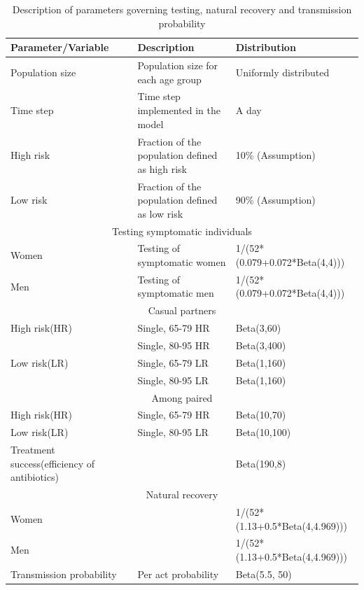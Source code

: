 \documentclass{article}
\begin{document}
\begin{normalsize}
	
	\begin{table}[H]
	\centering
    	\begin{tabular}{ |p{5cm}|p{7cm}|p{5cm}| } 
    		\hline
    		Parameter/Variable & Description & Distribution  \\ 
    		\hline
    		Population size & Population size for each age group & Uniformly distributed\\
    		Time step &	Time step implemented in the model & 	A day \\
			High risk & Fraction of the population defined as high risk	& 10\% (Assumption) \\
			Low risk & Fraction of the population defined as low risk & 90\% (Assumption)\\
			\hline
			\multicolumn{3}{|c|}{Testing symptomatic individuals} \\
			\hline
			Women &	Testing of symptomatic  women	& 1/(52*(0.079+0.072*Beta(4,4)))\\
			Men	& Testing of symptomatic men	& 1/(52*(0.079+0.072*Beta(4,4)))\\
			\hline
			\multicolumn{3}{|c|}{Casual partners} \\
			\hline
			High risk(HR)& Single, 65-79 HR	& Beta(3,60)\\
 						 & Single, 80-95 HR	& Beta(3,400)\\
			Low risk(LR)	 & Single, 65-79 LR	& Beta(1,160) \\
 						 & Single, 80-95 LR	&Beta(1,160)\\
 			\hline
 			\multicolumn{3}{|c|}{Among paired} \\
 			\hline
			High risk(HR)& Single, 65-79 HR	& Beta(10,70)\\
			Low risk(LR) & Single, 80-95 LR	& Beta(10,100)\\
			Treatment success(efficiency of antibiotics)	 & & Beta(190,8)\\
			\hline
			\multicolumn{3}{|c|}{Natural recovery} \\
			\hline
			Women & & 1/(52*(1.13+0.5*Beta(4,4.969)))\\
			Men & & 1/(52*(1.13+0.5*Beta(4,4.969)))\\
			Transmission probability	 & Per act probability	& Beta(5.5, 50)\\
    		\hline
    	\end{tabular}
    	
    	\caption{Description of parameters governing testing, natural recovery and transmission probability}
    	\label{tab:parameter}
   \end{table}
   

\end{normalsize}
\end{document}
